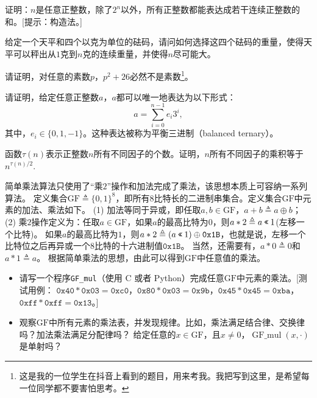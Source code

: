 \begin{problemset}
  \item 证明：$n$是任意正整数，除了$2^n$以外，所有正整数都能表达成若干连续正整数的和。[提示：构造法。]

  \item 给定一个天平和四个以克为单位的砝码，请问如何选择这四个砝码的重量，使得天平可以秤出从$1$克到$n$克的连续重量，并使得$n$尽可能大。

  \item
  请证明，对任意的素数$p$，$p^2 + 26$必然不是素数\footnote{这是我的一位学生在抖音上看到的题目，用来考我。我把写到这里，是希望每一位同学都不要害怕思考。}。

  \item 请证明，给定任意正整数$a$，$a$都可以唯一地表达为以下形式：
  \[a = \sum_{i = 0 }^{n-1} e_i 3^i,\]
  其中，$e_i \in \{0, 1, -1\}$。这种表达被称为平衡三进制（balanced ternary）。

  \item 函数$\tau(n)$表示正整数$n$所有不同因子的个数。证明，$n$所有不同因子的乘积等于$n^{\tau(n)/2}$. %

  \item \label{prob:gf}
  简单乘法算法只使用了“乘$2$”操作和加法完成了乘法，该思想本质上可容纳一系列算法。
  定义集合$\mathrm{GF} \triangleq \{0,1\}^8$，即所有$8$比特长的二进制串集合。定义集合$\mathrm{GF}$中元素的加法、乘法如下。
           (1) 加法等同于异或，即任取$a, b \in \mathrm{GF}$，$a + b \triangleq a \oplus b$；
           (2) 乘$2$操作定义为：任取$a\in \mathrm{GF}$，如果$a$的最高比特为$0$，则$a\ast 2 \triangleq a \mathbin{\text{\ttfamily <<}} 1$(左移一个比特)。
            如果$a$的最高比特为$1$，则$a\ast 2 \triangleq (a \mathbin{\text{\ttfamily <<}} 1) \oplus \mathtt{0x1B}$，也就是说，左移一个比特位之后再异或一个$8$比特的十六进制值$\mathtt{0x1B}$。
            当然，还需要有，$a \ast 0 \triangleq 0$和$a \ast 1 \triangleq a$。
  根据简单乘法的思想，由此可以得到$\mathrm{GF}$中任意值的乘法。
  \begin{itemize}
     \item 请写一个程序\texttt{GF\_mul}（使用 C 或者 Python）完成任意$\mathrm{GF}$中元素的乘法。[测试用例：
     $\mathtt{0x40}\ast\mathtt{0x03} = \mathtt{0xc0}$，$\mathtt{0x80}\ast\mathtt{0x03} = \mathtt{0x9b}$，$\mathtt{0x45}\ast\mathtt{0x45} = \mathtt{0xba}$，$\mathtt{0xff}\ast\mathtt{0xff} = \mathtt{0x13}$。]

     \item 观察$\mathrm{GF}$中所有元素的乘法表，并发现规律。比如，乘法满足结合律、交换律吗？加法乘法满足分配律吗？
      给定任意的$x\in \mathrm{GF}$，且$x \ne 0$，$\operatorname{GF\_mul}(x, \cdot)$是单射吗？


\end{itemize}
\end{problemset}
